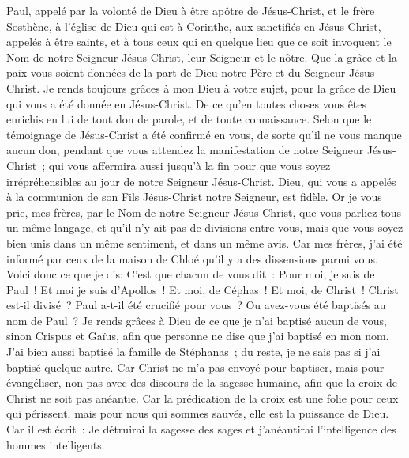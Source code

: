 \begin{multicols}{2}
\VerseOne{}Paul, appelé par la volonté de Dieu à être apôtre de Jésus-Christ, et le frère Sosthène,
à l'église de Dieu qui est à Corinthe, aux sanctifiés en Jésus-Christ, appelés à être saints, et à tous ceux qui en quelque lieu que ce soit invoquent le Nom de notre Seigneur Jésus-Christ, leur Seigneur et le nôtre.
Que la grâce et la paix vous soient données de la part de Dieu notre Père et du Seigneur Jésus-Christ.
Je rends toujours grâces à mon Dieu à votre sujet, pour la grâce de Dieu qui vous a été donnée en Jésus-Christ.
De ce qu'en toutes choses vous êtes enrichis en lui de tout don de parole, et de toute connaissance. 
Selon que le témoignage de Jésus-Christ a été confirmé en vous,
de sorte qu'il ne vous manque aucun don, pendant que vous attendez la manifestation de notre Seigneur Jésus-Christ~;
qui vous affermira aussi jusqu'à la fin pour que vous soyez irrépréhensibles au jour de notre Seigneur Jésus-Christ.
Dieu, qui vous a appelés à la communion de son Fils Jésus-Christ notre Seigneur, est fidèle.
Or je vous prie, mes frères, par le Nom de notre Seigneur Jésus-Christ, que vous parliez tous un même langage, et qu'il n'y ait pas de divisions entre vous, mais que vous soyez bien unis dans un même sentiment, et dans un même avis.
Car mes frères, j'ai été informé par ceux de la maison de Chloé qu'il y a des dissensions parmi vous.
Voici donc ce que je dis: C'est que chacun de vous dit~: Pour moi, je suis de Paul~! Et moi je suis d'Apollos~! Et moi, de Céphas~! Et moi, de Christ~!
Christ est-il divisé~? Paul a-t-il été crucifié pour vous~? Ou avez-vous été baptisés au nom de Paul~?
Je rends grâces à Dieu de ce que je n'ai baptisé aucun de vous, sinon Crispus et Gaïus,
afin que personne ne dise que j'ai baptisé en mon nom.
J'ai bien aussi baptisé la famille de Stéphanas~; du reste, je ne sais pas si j'ai baptisé quelque autre.
Car Christ ne m'a pas envoyé pour baptiser, mais pour évangéliser, non pas avec des discours de la sagesse humaine, afin que la croix de Christ ne soit pas anéantie.
Car la prédication de la croix est une folie pour ceux qui périssent, mais pour nous qui sommes sauvés, elle est la puissance de Dieu.
Car il est écrit~: Je détruirai la sagesse des sages et j'anéantirai l'intelligence des hommes intelligents.

\end{multicols}

